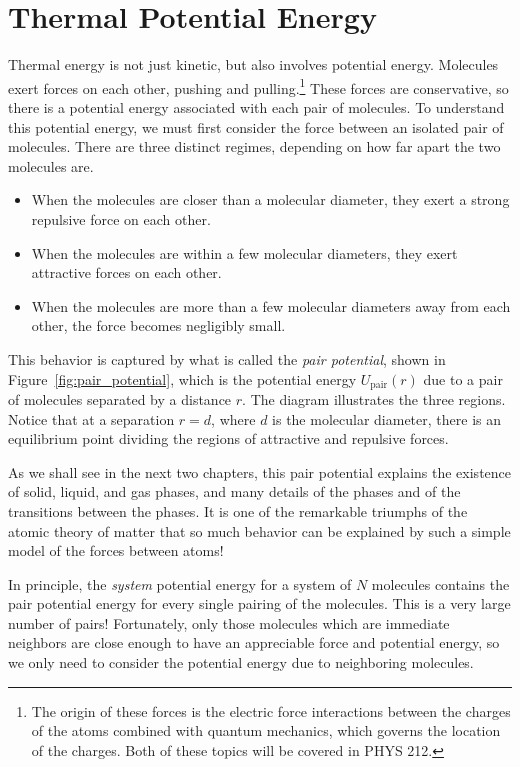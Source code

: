 \section{Thermal Potential Energy}

\label{sec:thermal_potential_energy}

Thermal energy is not just kinetic, but also involves potential
energy.  Mole\-cules exert forces on each other, pushing and
pulling.\footnote{The origin of these forces is the electric force
  interactions between the charges of the atoms combined with quantum
  mechanics, which governs the location of the charges.  Both of these
  topics will be covered in PHYS 212.}  These forces are conservative,
so there is a potential energy associated with each pair of molecules.
To understand this potential energy, we must first consider the force
between an isolated pair of molecules.  There are three distinct
regimes, depending on how far apart the two molecules are.
\begin{itemize}
\item When the molecules are closer than a molecular diameter, they
exert a strong repulsive force on each other.
\item When the molecules are within a few molecular diameters, they
exert attractive forces on each other.
\item When the molecules are more than a few molecular diameters away
from each other, the force becomes negligibly small.
\end{itemize}

This behavior is captured by what is called the \textit{pair
  potential}, shown in Figure~\ref{fig:pair_potential}, which is the
potential energy $U_\text{pair}(r)$ due to a pair of molecules
separated by a distance $r$.  The diagram illustrates the three
regions.  Notice that at a separation $r=d$, where $d$ is the
molecular diameter, there is an equilibrium point dividing the regions
of attractive and repulsive forces.

As we shall see in the next two chapters, this pair potential explains
the existence of solid, liquid, and gas phases, and many details of
the phases and of the transitions between the phases.  It is one of
the remarkable triumphs of the atomic theory of matter that so much
behavior can be explained by such a simple model of the forces between
atoms!

In principle, the \textit{system} potential energy for a system of $N$
molecules contains the pair potential energy for every single pairing
of the molecules.  This is a very large number of pairs!  Fortunately,
only those molecules which are immediate neighbors are close enough to
have an appreciable force and potential energy, so we only need to
consider the potential energy due to neighboring molecules.

